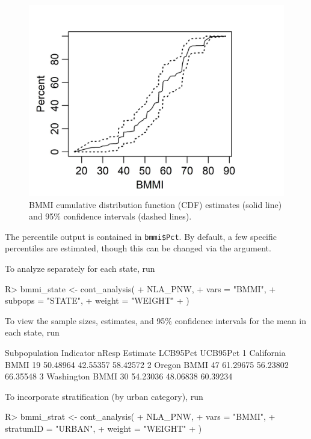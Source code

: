 \documentclass[
  shortnames]{jss}
\begin{document}
\begin{figure}
\centering
\includegraphics[width = 0.49\linewidth]{images/bmmi_cdf.jpeg}
\caption{BMMI cumulative distribution function (CDF) estimates (solid line) and 95\% confidence intervals (dashed lines).}
\label{fig:bmmi_cdf}
\end{figure}

The percentile output is contained in \texttt{bmmi\$Pct}. By default, a
few specific percentiles are estimated, though this can be changed via
the  argument.

To analyze  separately for each state, run

\begin{CodeChunk}
\begin{CodeInput}
R> bmmi_state <- cont_analysis(
+   NLA_PNW, 
+   vars = "BMMI",
+   subpops = "STATE",
+   weight = "WEIGHT"
+ )
\end{CodeInput}
\end{CodeChunk}

To view the sample sizes, estimates, and 95\% confidence intervals for
the mean in each state, run

\begin{CodeChunk}
\begin{CodeOutput}
  Subpopulation Indicator nResp Estimate LCB95Pct UCB95Pct
1    California      BMMI    19 50.48964 42.55357 58.42572
2        Oregon      BMMI    47 61.29675 56.23802 66.35548
3    Washington      BMMI    30 54.23036 48.06838 60.39234
\end{CodeOutput}
\end{CodeChunk}

To incorporate stratification (by urban category), run

\begin{CodeChunk}
\begin{CodeInput}
R> bmmi_strat <-  cont_analysis(
+   NLA_PNW,
+   vars = "BMMI",
+   stratumID = "URBAN",
+   weight = "WEIGHT"
+ )
\end{CodeInput}
\end{CodeChunk}
\end{document}
